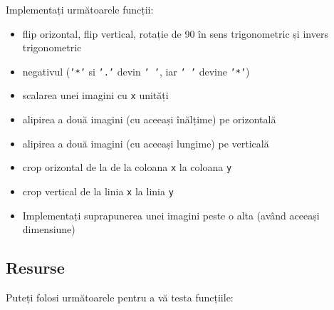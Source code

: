 Implementați următoarele funcții:
\begin{itemize}
	\item  flip orizontal, flip vertical, rotație de 90 în sens trigonometric și invers trigonometric
	\item  negativul (\texttt{'*'} si \texttt{'.'} devin \texttt{' '}, iar \texttt{' '} devine \texttt{'*'})
	\item  scalarea unei imagini cu \texttt{x} unități
	\item  alipirea a două imagini (cu aceeași înălțime) pe orizontală
	\item  alipirea a două imagini (cu aceeași lungime) pe verticală
	\item  crop orizontal de la de la coloana \texttt{x} la coloana \texttt{y}
	\item  crop vertical de la linia \texttt{x} la linia \texttt{y}
	\item  Implementați suprapunerea unei imagini peste o alta (având aceeași dimensiune)
\end{itemize}


\subsection*{ Resurse }

Puteți folosi următoarele pentru a vă testa funcțiile:


